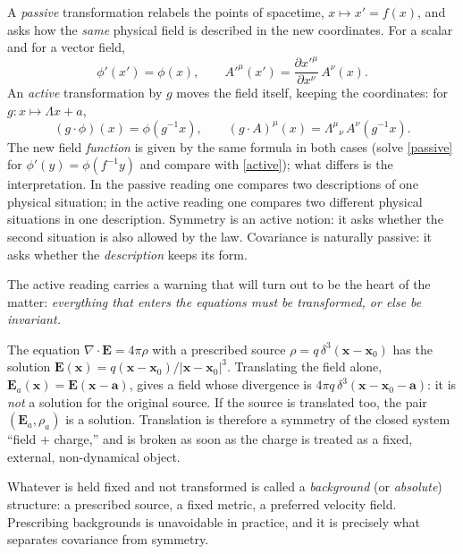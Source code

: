 A \emph{passive} transformation relabels the points of spacetime,
$x\mapsto x'=f(x)$, and asks how the \emph{same} physical field is described
in the new coordinates. For a scalar and for a vector field,
\begin{equation}\label{passive}
  \phi'(x') = \phi(x),\qquad
  A'^\mu(x') = \frac{\partial x'^\mu}{\partial x^\nu}\,A^\nu(x).
\end{equation}
An \emph{active} transformation by $g$ moves the field itself, keeping the
coordinates: for $g\colon x\mapsto \Lambda x + a$,
\begin{equation}\label{active}
  (g\cdot\phi)(x) = \phi(g^{-1}x),\qquad
  (g\cdot A)^\mu(x) = \Lambda^\mu{}_\nu\,A^\nu(g^{-1}x).
\end{equation}
The new field \emph{function} is given by the same formula in both cases
(solve \eqref{passive} for $\phi'(y)=\phi(f^{-1}y)$ and compare with
\eqref{active}); what differs is the interpretation. In the passive
reading one compares two descriptions of one physical situation; in the
active reading one compares two different physical situations in one
description. Symmetry is an active notion: it asks whether the second
situation is also allowed by the law. Covariance is naturally passive: it asks
whether the \emph{description} keeps its form.


The active reading carries a warning that will turn out to be the heart of
the matter: \emph{everything that enters the equations must be transformed,
or else be invariant.}

\begin{example}\label{ex:coulomb}
The equation $\nabla\!\cdot{\bm{E}}=4\pi\rho$ with a prescribed source
$\rho=q\,\delta^3({\bm{x}}-{\bm{x}}_0)$ has the solution
${\bm{E}}({\bm{x}})=q({\bm{x}}-{\bm{x}}_0)/|{\bm{x}}-{\bm{x}}_0|^3$. Translating the field alone,
${\bm{E}}_a({\bm{x}})={\bm{E}}({\bm{x}}-\bm a)$, gives a field whose divergence is
$4\pi q\,\delta^3({\bm{x}}-{\bm{x}}_0-\bm a)$: it is \emph{not} a solution for the
original source. If the source is translated too, the pair
$({\bm{E}}_a,\rho_a)$ is a solution. Translation is therefore a symmetry of the
closed system ``field $+$ charge,'' and is broken as soon as the charge is
treated as a fixed, external, non-dynamical object.
\end{example}

Whatever is held fixed and not transformed is called a \emph{background} (or
\emph{absolute}) structure: a prescribed source, a fixed metric, a preferred
velocity field. Prescribing backgrounds is unavoidable in practice, and it is
precisely what separates covariance from symmetry.

